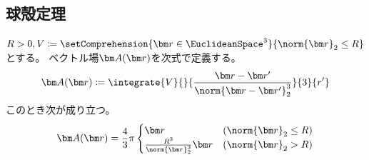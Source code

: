         \subsection{球殻定理}
            \begin{shadebox}
                $R>0,V \coloneq \setComprehension{\vr\in\EuclideanSpace^3}{\norm{\vr}_2\leq R}$とする。
                ベクトル場$\vA(\vr)$を次式で定義する。
                \[ \vA(\vr) \coloneq \integrate{V}{}{\frac{\vr-\vr'}{\norm{\vr-\vr'}_2^3}}{3}{r'} \]
                このとき次が成り立つ。
                \[
                    \vA(\vr) = \frac{4}{3}\pi
                    \begin{cases}
                        \vr & (\norm{\vr}_2\leq R) \\
                        \frac{R^3}{\norm{\vr}_2^3}\vr & (\norm{\vr}_2 > R)
                    \end{cases}
                \]
            \end{shadebox}
